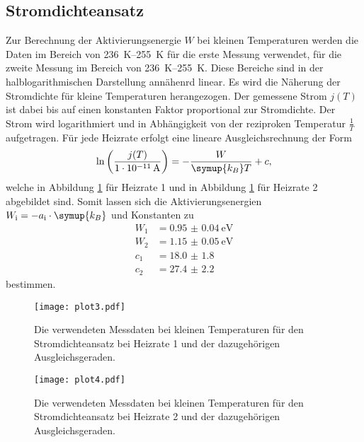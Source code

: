 \subsection{Stromdichteansatz}
\label{sec:klT}
Zur Berechnung der Aktivierungsenergie $W$ bei kleinen Temperaturen werden die Daten im Bereich von \SIrange{236}{255}{\kelvin} für die erste Messung verwendet, für die zweite Messung im Bereich von \SIrange{236}{255}{\kelvin}.
Diese Bereiche sind in der halblogarithmischen Darstellung annähenrd linear.
Es wird die Näherung der Stromdichte für kleine Temperaturen herangezogen.
Der gemessene Strom $j(T)$ ist dabei bis auf einen konstanten Faktor proportional zur Stromdichte.
Der Strom wird logarithmiert und in Abhängigkeit von der reziproken Temperatur $\frac{1}{T}$ aufgetragen.
Für jede Heizrate erfolgt eine lineare Ausgleichsrechnung der Form
\begin{equation}
    \label{eqn:lin}
    \ln\left(\frac{j(T)}{\SI{1e-11}{\ampere}}\right) = -\frac{W}{\symup{k_B} T} + c,
\end{equation}
welche in Abbildung \ref{fig:plot3} für Heizrate 1 und in Abbildung \ref{fig:plot3} für Heizrate 2 abgebildet sind.
Somit lassen sich die Aktivierungsenergien $W_\text{i} = -a_\text{i} \cdot \symup{k_B}$ und Konstanten zu
\begin{align*}
    W_1 &= \SI{0.95(4)}{\electronvolt} \\
    W_2 &= \SI{1.15(5)}{\electronvolt} \\
    c_1 &= \num{18.0(18)} \\
    c_2 &= \num{27.4(22)}
\end{align*}
bestimmen.

\begin{figure}
  \centering
  \texttt{[image: plot3.pdf]}
  \caption{Die verwendeten Messdaten bei kleinen Temperaturen für den Stromdichteansatz bei Heizrate 1 und der dazugehörigen Ausgleichsgeraden.}
  \label{fig:plot3}
\end{figure}
\begin{figure}
  \centering
  \texttt{[image: plot4.pdf]}
  \caption{Die verwendeten Messdaten bei kleinen Temperaturen für den Stromdichteansatz bei Heizrate 2 und der dazugehörigen Ausgleichsgeraden.}
  \label{fig:plot4}
\end{figure}
\FloatBarrier

